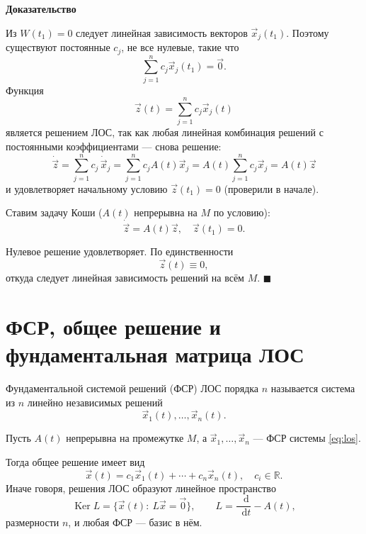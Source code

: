 \documentclass[12pt,a4paper]{article}
\numberwithin{equation}{section}
\newcommand{\R}{\mathbb{R}}
\newcommand{\vect}[1]{\vec{#1}}
\newcommand{\dd}{\mathop{}\!\mathrm{d}}
\renewenvironment{proof}[1][Доказательство]{\begin{center}\textbf{#1}\end{center}}{\hfill$\blacksquare$\par}
\DeclareRobustCommand{\examtag}[1]{\space{\normalfont\small\color{HSEgray}(#1)}}
\begin{document}
\begin{proof}
Из $W(t_1)=0$ следует линейная зависимость векторов $\vect{x}_j(t_1)$. Поэтому существуют постоянные $c_j$, не все нулевые, такие что
\[
\sum_{j=1}^{n}c_j\vect{x}_j(t_1)=\vect{0}.
\]
Функция
\[
\vect{z}(t)=\sum_{j=1}^{n}c_j\vect{x}_j(t)
\]
является решением ЛОС, так как любая линейная комбинация решений с постоянными коэффициентами --- снова решение:
\[
\dot{\vect{z}}
= \sum_{j=1}^{n} c_j\,\dot{\vect{x}}_j
= \sum_{j=1}^{n} c_j A(t)\vect{x}_j
= A(t)\sum_{j=1}^{n} c_j\vect{x}_j
= A(t)\vect{z}
\]
и удовлетворяет начальному условию $\vect{z}(t_1)=0$ (проверили в начале). 

Ставим задачу Коши (\(A(t)\) непрерывна на \(M\) по условию):
\[
\dot{\vect{z}} = A(t)\vect{z}, \quad \vect{z}(t_1) = 0.
\]

Нулевое решение удовлетворяет. По единственности
\[
\vect{z}(t)\equiv0,
\]
откуда следует линейная зависимость решений на всём $M$.
\end{proof}

\section[ФСР и фундаментальная матрица ЛОС\examtag{вопрос~14}]{ФСР, общее решение и фундаментальная матрица ЛОС\examtag{вопрос~14}}

\begin{definitionHSE}
Фундаментальной системой решений (ФСР) ЛОС порядка $n$ называется система из $n$ линейно независимых решений
\[
\vect{x}_1(t),\ldots,\vect{x}_n(t).
\]
\end{definitionHSE}

\begin{theoremHSE}
Пусть $A(t)$ непрерывна на промежутке $M$, а $\vect{x}_1,\ldots,\vect{x}_n$ --- ФСР системы \eqref{eq:los}.

Тогда общее решение имеет вид
\[
\vect{x}(t)=c_1\vect{x}_1(t)+\cdots+c_n\vect{x}_n(t),
\quad c_i\in\R.
\]
Иначе говоря, решения ЛОС образуют линейное пространство
\[
\operatorname{Ker}L=\bigl\{\vect{x}(t):\ L\vect{x}=\vect{0}\bigr\},\qquad L=\frac{\dd}{\dd t}-A(t),
\]
размерности $n$, и любая ФСР --- базис в нём.
\end{theoremHSE}
\end{document}
